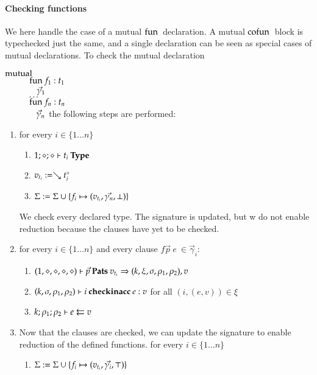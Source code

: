 \paragraph*{Checking functions}
We here handle the case of a mutual $\fun$ declaration.
A mutual $\cofun$ block is typechecked just the same,
and a single declaration can be seen as special cases of mutual declarations.
To check the mutual declaration
\begin{bsp}
$\mutual$\\
$\spcx \fun f_1 : t_1 $\\
$\spcx \spc \vec{\gamma}_1$\\
$\spcx \ldots$\\
$\spcx \fun f_n : t_n $\\
$\spcx \spc \vec{\gamma}_n$
the following steps are performed:
\end{bsp}
\begin{enumerate}
\item
for every $i \in \{1 \ldots n \} $
\begin{enumerate}
\item
$\IsType{1}{\diamond}{\diamond}{t_i}$
\item
$v_{t_i} := \wh \cl{t_i}{\diamond}$
\item
$\Sig := \Sig \cup \{f_i \mapsto (v_{t_i},\vec{\gamma_n},\bot)\}$
\end{enumerate}
We check every declared type. The signature is updated, 
but w do not enable reduction because the clauses have yet to be checked. 
\item
for every $i \in \{ 1 \ldots n \} $ and every clause  $ f \vec{p} \: e \: \in \vec{\gamma}_i$:
\begin{enumerate}
\item
$\checkps{1,\diamond,\diamond,\diamond,\diamond}{\vec{p}}{v_{t_i}}{k,\xi,\sigma,\rho_1,\rho_2}{v}$
\item
$\checkinacc{k,\sigma,\rho_1,\rho_2}{i}{e}{v}$ for all $(i,(e,v)) \in \xi$ 
\item 
$\Check{k}{\rho_1}{\rho_2}{e}{v}$
\end{enumerate}
\item
Now that the clauses are checked, we can update the signature to enable reduction of the defined functions.
for every $i \in \{ 1 \ldots n \} $
\begin{enumerate}
\item
$\Sig := \Sig \cup \{f_i \mapsto (v_{t_i},\vec{\gamma_i},\top)\}$
\end{enumerate}
\end{enumerate}

